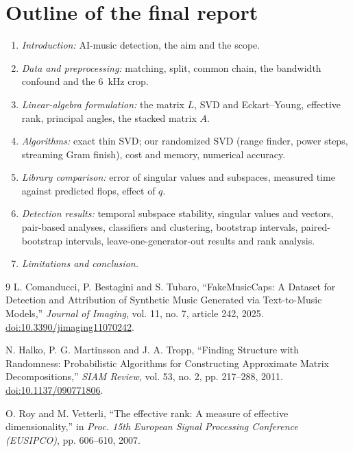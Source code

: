 \documentclass[11pt,a4paper]{article}
\theoremstyle{plain}
\theoremstyle{definition}
\theoremstyle{remark}
\newcommand{\bodyend}{\label{body-end}}
\begin{document}
\section{Outline of the final report}
\begin{enumerate}\itemsep0pt
\item \emph{Introduction:} AI-music detection, the aim and the scope.
\item \emph{Data and preprocessing:} matching, split, common chain, the
  bandwidth confound and the 6~kHz crop.
\item \emph{Linear-algebra formulation:} the matrix $L$, SVD and
  Eckart--Young, effective rank, principal angles, the stacked matrix $A$.
\item \emph{Algorithms:} exact thin SVD; our randomized SVD (range finder,
  power steps, streaming Gram finish), cost and memory, numerical accuracy.
\item \emph{Library comparison:} error of singular values and subspaces,
  measured time against predicted flops, effect of $q$.
\item \emph{Detection results:} temporal subspace stability, singular values and vectors,
  pair-based analyses, classifiers and clustering, bootstrap intervals,
  paired-bootstrap intervals, leave-one-generator-out results and rank analysis.
\item \emph{Limitations and conclusion.}
\end{enumerate}

\bodyend

\clearpage
\begin{thebibliography}{9}
L. Comanducci, P. Bestagini and S. Tubaro,
``FakeMusicCaps: A Dataset for Detection and Attribution of Synthetic Music
Generated via Text-to-Music Models,'' \emph{Journal of Imaging}, vol. 11,
no. 7, article 242, 2025.
\href{https://doi.org/10.3390/jimaging11070242}{doi:10.3390/jimaging11070242}.

N. Halko, P. G. Martinsson and J. A. Tropp,
``Finding Structure with Randomness: Probabilistic Algorithms for Constructing
Approximate Matrix Decompositions,'' \emph{SIAM Review}, vol. 53, no. 2,
pp. 217--288, 2011.
\href{https://doi.org/10.1137/090771806}{doi:10.1137/090771806}.

O. Roy and M. Vetterli,
``The effective rank: A measure of effective dimensionality,'' in
\emph{Proc. 15th European Signal Processing Conference (EUSIPCO)},
pp. 606--610, 2007.
\end{thebibliography}
\end{document}
